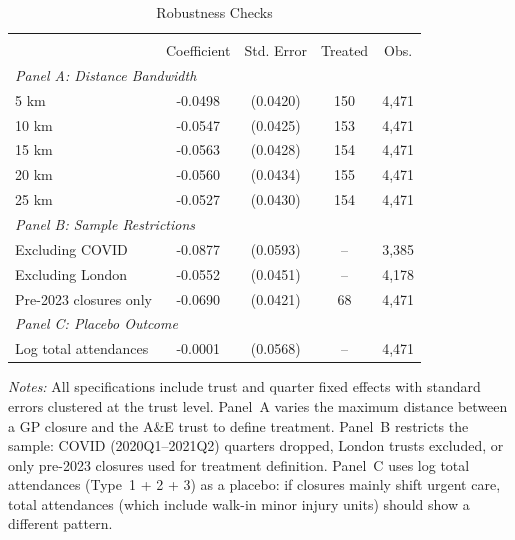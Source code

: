 \begin{table}[t]
\centering
\caption{Robustness Checks}
\label{tab:robustness}
\begin{tabular}{lcccc}
\hline\hline
\\[-1.8ex]
 & Coefficient & Std. Error & Treated & Obs. \\
\hline
\multicolumn{5}{l}{\textit{Panel A: Distance Bandwidth}} \\
  5 km & -0.0498 & (0.0420) & 150 & 4,471 \\
  10 km & -0.0547 & (0.0425) & 153 & 4,471 \\
  15 km & -0.0563 & (0.0428) & 154 & 4,471 \\
  20 km & -0.0560 & (0.0434) & 155 & 4,471 \\
  25 km & -0.0527 & (0.0430) & 154 & 4,471 \\
\hline
\multicolumn{5}{l}{\textit{Panel B: Sample Restrictions}} \\
  Excluding COVID & -0.0877 & (0.0593) & -- & 3,385 \\
  Excluding London & -0.0552 & (0.0451) & -- & 4,178 \\
  Pre-2023 closures only & -0.0690 & (0.0421) & 68 & 4,471 \\
\hline
\multicolumn{5}{l}{\textit{Panel C: Placebo Outcome}} \\
  Log total attendances & -0.0001 & (0.0568) & -- & 4,471 \\
\hline\hline
\end{tabular}
\begin{tablenotes}
\small
\item \textit{Notes:} All specifications include trust and quarter fixed effects with standard errors clustered at the trust level. Panel~A varies the maximum distance between a GP closure and the A\&E trust to define treatment. Panel~B restricts the sample: COVID (2020Q1--2021Q2) quarters dropped, London trusts excluded, or only pre-2023 closures used for treatment definition. Panel~C uses log total attendances (Type~1 + 2 + 3) as a placebo: if closures mainly shift urgent care, total attendances (which include walk-in minor injury units) should show a different pattern.
\end{tablenotes}
\end{table}
